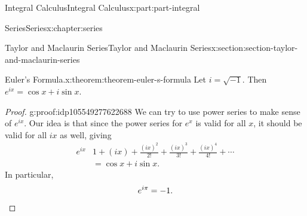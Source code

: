 \documentclass[twoside,10pt,]{book}
\numberwithin{equation}{part}
\newcommand{\qedhere}{\relax}
\newcommand{\amp}{&}
\begin{document}
\begin{partptx}{Integral Calculus}{}{Integral Calculus}{}{}{x:part:part-integral}
\begin{chapterptx}{Series}{}{Series}{}{}{x:chapter:series}
\begin{sectionptx}{Taylor and Maclaurin Series}{}{Taylor and Maclaurin Series}{}{}{x:section:section-taylor-and-maclaurin-series}
\begin{theorem}{Euler's Formula.}{}{x:theorem:theorem-euler-s-formula}%
Let \(i = \sqrt{-1}\). Then \(e^{ix} = \cos x + i\sin x\).%
\end{theorem}
\begin{proof}{}{g:proof:idp105549277622688}
We can try to use power series to make sense of \(e^{ix}\). Our idea is that since the power series for \(e^{x}\) is valid for all \(x\), it should be valid for all \(ix\) as well, giving%
\begin{align*}
e^{ix} \amp 1 + (ix) + \frac{(ix)^{2}}{2!} + \frac{(ix)^{3}}{3!} + \frac{(ix)^{4}}{4!} + \cdots \\
\amp = \cos x + i\sin x \text{.}
\end{align*}
In particular,%
\begin{equation*}
e^{i\pi} = -1\text{.}\qedhere
\end{equation*}
%
\end{proof}
\end{sectionptx}
\end{chapterptx}
 \end{partptx}
%
%
\typeout{************************************************}
\typeout{************************************************}
%
\end{document}
